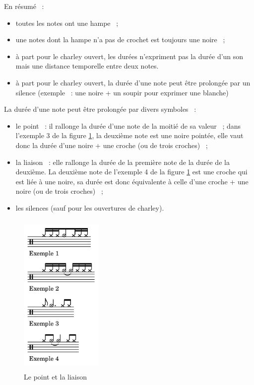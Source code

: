 En résumé~ :
\begin{itemize}
    \item toutes les notes ont une hampe~ ;
    \item une notes dont la hampe n’a pas de crochet est toujours une noire~ ;
    \item à part pour le charley ouvert, les durées n’expriment pas la durée
        d’un son mais une distance temporelle entre deux notes.
    \item à part pour le charley ouvert, la durée d’une note peut être
        prolongée par un silence (exemple~ : une noire + un soupir pour exprimer
        une blanche)\\
\end{itemize}
La durée d’une note peut être prolongée par divers symboles~ :
\begin{itemize}
	\item le point~ : il rallonge la durée d’une note de la moitié de sa valeur~ ;
        dans l’exemple 3 de la figure \ref{point_liaison}, la deuxième note
        est une noire pointée, elle vaut donc la durée d’une noire + une croche
        (ou de trois croches)~ ;
	\item la liaison~ : elle rallonge la durée de la première note de la durée
        de la deuxième. La deuxième note de l’exemple 4 de la figure
        \ref{point_liaison} est une croche qui est liée à une noire, sa durée
        est donc équivalente à celle d’une croche + une noire (ou de trois
        croches)~ ;
    \item les silences (sauf pour les ouvertures de charley).\\
\end{itemize}

\begin{figure}[h]
	\centering
	\includegraphics[height=80mm, width=40mm]{
    z_images/3_methodes/0_notation_de_la_batterie/3_point_et_liaison.png}
	\caption{Le point et la liaison}
	\label{point_liaison}
\end{figure}

